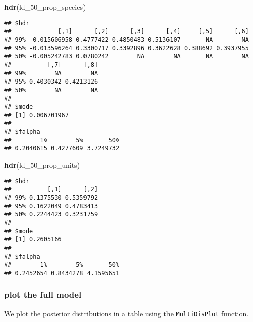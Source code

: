\documentclass[]{article}
\newenvironment{Shaded}{\begin{snugshade}}{\end{snugshade}}
\newcommand{\KeywordTok}[1]{\textcolor[rgb]{0.13,0.29,0.53}{\textbf{#1}}}
\newcommand{\NormalTok}[1]{#1}
\begin{document}
\begin{Shaded}
\begin{Highlighting}[]
\KeywordTok{hdr}\NormalTok{(ld_50_prop_species)}
\end{Highlighting}
\end{Shaded}

\begin{verbatim}
## $hdr
##             [,1]      [,2]      [,3]      [,4]     [,5]      [,6]
## 99% -0.015606958 0.4777422 0.4850483 0.5136107       NA        NA
## 95% -0.013596264 0.3300717 0.3392896 0.3622628 0.388692 0.3937955
## 50% -0.005242783 0.0780242        NA        NA       NA        NA
##          [,7]      [,8]
## 99%        NA        NA
## 95% 0.4030342 0.4213126
## 50%        NA        NA
## 
## $mode
## [1] 0.006701967
## 
## $falpha
##        1%        5%       50% 
## 0.2040615 0.4277609 3.7249732
\end{verbatim}

\begin{Shaded}
\begin{Highlighting}[]
\KeywordTok{hdr}\NormalTok{(ld_50_prop_units)}
\end{Highlighting}
\end{Shaded}

\begin{verbatim}
## $hdr
##          [,1]      [,2]
## 99% 0.1375530 0.5359792
## 95% 0.1622049 0.4783413
## 50% 0.2244423 0.3231759
## 
## $mode
## [1] 0.2605166
## 
## $falpha
##        1%        5%       50% 
## 0.2452654 0.8434278 4.1595651
\end{verbatim}

\subsubsection{plot the full model}\label{plot-the-full-model}

We plot the posterior distributions in a table using the
\texttt{MultiDisPlot} function.
\end{document}
